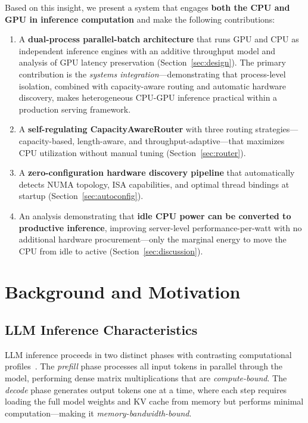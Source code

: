 \documentclass[10pt,conference]{IEEEtran}
\begin{document}
Based on this insight, we present a system that engages \textbf{both the CPU and GPU in inference computation} and make the following contributions:
\begin{enumerate}
\item A \textbf{dual-process parallel-batch architecture} that runs GPU and CPU as independent inference engines with an additive throughput model and analysis of GPU latency preservation (Section~\ref{sec:design}).
The primary contribution is the \emph{systems integration}---demonstrating that process-level isolation, combined with capacity-aware routing and automatic hardware discovery, makes heterogeneous CPU-GPU inference practical within a production serving framework.
\item A \textbf{self-regulating CapacityAwareRouter} with three routing strategies---capacity-based, length-aware, and throughput-adaptive---that maximizes CPU utilization without manual tuning (Section~\ref{sec:router}).
\item A \textbf{zero-configuration hardware discovery pipeline} that automatically detects NUMA topology, ISA capabilities, and optimal thread bindings at startup (Section~\ref{sec:autoconfig}).
\item An analysis demonstrating that \textbf{idle CPU power can be converted to productive inference}, improving server-level performance-per-watt with no additional hardware procurement---only the marginal energy to move the CPU from idle to active (Section~\ref{sec:discussion}).
\end{enumerate}

\section{Background and Motivation}
\label{sec:background}

\subsection{LLM Inference Characteristics}
\label{sec:bg-llm}

LLM inference proceeds in two distinct phases with contrasting computational profiles~\cite{agrawal2023sarathi, agrawal2024sarathiserve}.
The \emph{prefill} phase processes all input tokens in parallel through the model, performing dense matrix multiplications that are \emph{compute-bound}.
The \emph{decode} phase generates output tokens one at a time, where each step requires loading the full model weights and KV cache from memory but performs minimal computation---making it \emph{memory-bandwidth-bound}.
\end{document}
